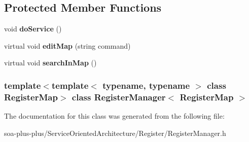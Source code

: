 \subsection*{Protected Member Functions}
\begin{DoxyCompactItemize}
\item 
\hypertarget{class_register_manager_adcd6114b97da438b8e7c21ed247e1309}{
void {\bfseries doService} ()}
\label{class_register_manager_adcd6114b97da438b8e7c21ed247e1309}

\item 
\hypertarget{class_register_manager_aea17dfb6051f49059de102f91561e4d7}{
virtual void {\bfseries editMap} (string command)}
\label{class_register_manager_aea17dfb6051f49059de102f91561e4d7}

\item 
\hypertarget{class_register_manager_a6425be6c0e7a75034c0ddab00cde2f97}{
virtual void {\bfseries searchInMap} ()}
\label{class_register_manager_a6425be6c0e7a75034c0ddab00cde2f97}

\end{DoxyCompactItemize}
\subsubsection*{template$<$template$<$ typename, typename $>$ class RegisterMap$>$ class RegisterManager$<$ RegisterMap $>$}



The documentation for this class was generated from the following file:\begin{DoxyCompactItemize}
\item 
soa-\/plus-\/plus/ServiceOrientedArchitecture/Register/RegisterManager.h\end{DoxyCompactItemize}
